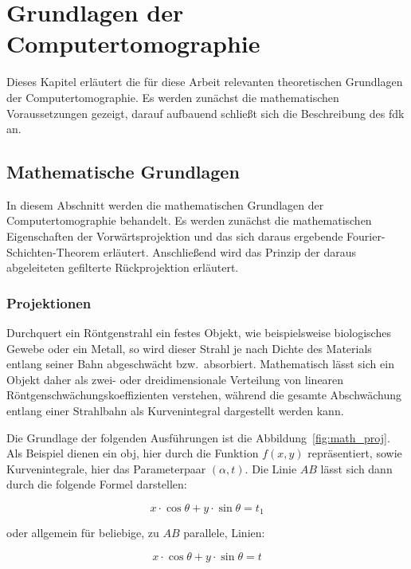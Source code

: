 \chapter{Grundlagen der Computertomographie}\label{chap:grundlagen_bp}

Dieses Kapitel erläutert die für diese Arbeit relevanten theoretischen Grundlagen der Computertomographie. Es werden
zunächst die mathematischen Voraussetzungen gezeigt, darauf aufbauend schließt sich die Beschreibung des \gls{fdk} an.

\section{Mathematische Grundlagen}

In diesem Abschnitt werden die mathematischen Grundlagen der Computertomographie behandelt. Es werden zunächst die
mathematischen Eigenschaften der Vorwärtsprojektion und das sich daraus ergebende Fourier-Schichten-Theorem erläutert.
Anschließend wird das Prinzip der daraus abgeleiteten gefilterte Rückprojektion erläutert.

\subsection{Projektionen}

Durchquert ein Röntgenstrahl ein festes Objekt, wie beispielsweise biologisches Gewebe oder ein Metall, so wird dieser
Strahl je nach Dichte des Materials entlang seiner Bahn abgeschwächt bzw.\ absorbiert. Mathematisch lässt sich ein
Objekt daher als zwei- oder dreidimensionale Verteilung von linearen Röntgenschwächungskoeffizienten verstehen, während
die gesamte Abschwächung entlang einer Strahlbahn als Kurvenintegral dargestellt werden kann.

Die Grundlage der folgenden Ausführungen ist die Abbildung~\ref{fig:math_proj}. Als Beispiel dienen ein \gls{obj}, hier
durch die Funktion $f(x, y)$ repräsentiert, sowie Kurvenintegrale, hier das Parameterpaar $(\alpha, t)$. Die Linie $AB$
lässt sich dann durch die folgende Formel darstellen:

\begin{equation*}
    x \cdot \cos \theta + y \cdot \sin \theta  = t_1
\end{equation*}

oder allgemein für beliebige, zu $AB$ parallele, Linien:

\begin{equation}\label{eq:proj_obj}
    x \cdot \cos \theta + y \cdot \sin \theta = t
\end{equation}

